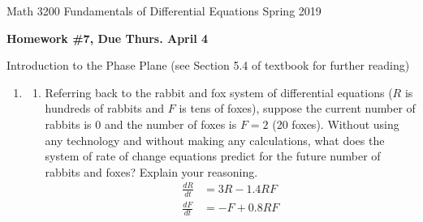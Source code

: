 \clearpage


Math 3200 \hfill Fundamentals of Differential Equations \hfill Spring 2019

\bigskip

\begin{center}{\large \textbf{Homework \#7, Due Thurs. April 4}} \end{center}
\begin{center}Introduction to the Phase Plane (see Section 5.4 of textbook for further reading)\end{center}

\bigskip

\begin{enumerate}
	


\item
\begin{enumerate}
\item Referring back to the rabbit and fox system of differential equations ($R$ is hundreds of rabbits and $F$ is tens of foxes), suppose the current number of rabbits is 0 and the number of foxes is $F=2$ (20 foxes). Without using any technology and without making any calculations, what does the system of rate of change equations predict for the future number of rabbits and foxes? Explain your reasoning. \label{09HWproblem3parta}
	\begin{align*}
	\frac{dR}{dt} &= 3R-1.4RF\\
	\frac{dF}{dt} &= -F+0.8RF
\end{align*}


\end{enumerate}
\end{enumerate}
